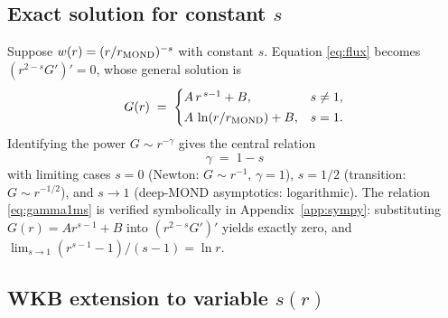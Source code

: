 \documentclass[aps,prd,twocolumn,superscriptaddress,nofootinbib]{revtex4-2}
\begin{document}
\subsection{Exact solution for constant $s$}

Suppose $w(r) = (r/r_{\rm MOND})^{-s}$ with constant $s$. Equation
\eqref{eq:flux} becomes $(r^{2-s} G')' = 0$, whose general solution
is
\begin{equation}
G(r) \;=\;
\begin{cases}
A\,r^{\,s-1} + B, & s\neq 1,\\[2pt]
A\,\ln(r/r_{\rm MOND}) + B, & s = 1.
\end{cases}
\label{eq:Gpow}
\end{equation}
Identifying the power $G\sim r^{-\gamma}$ gives the central
relation
\begin{equation}
\boxed{\;\gamma \;=\; 1 - s\;}
\label{eq:gamma1ms}
\end{equation}
with limiting cases $s=0$ (Newton: $G\sim r^{-1}$, $\gamma = 1$),
$s = 1/2$ (transition: $G\sim r^{-1/2}$), and $s\to 1$ (deep-MOND
asymptotics: logarithmic). The relation \eqref{eq:gamma1ms} is
verified symbolically in Appendix~\ref{app:sympy}: substituting
$G(r) = A r^{s-1}+B$ into $(r^{2-s}G')'$ yields exactly zero, and
$\lim_{s\to 1}(r^{s-1}-1)/(s-1) = \ln r$.

\subsection{WKB extension to variable $s(r)$}
\end{document}
